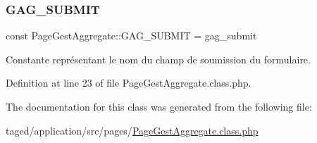 \subsubsection{\texorpdfstring{G\+A\+G\+\_\+\+S\+U\+B\+M\+IT}{GAG\_SUBMIT}}
{\footnotesize\ttfamily const Page\+Gest\+Aggregate\+::\+G\+A\+G\+\_\+\+S\+U\+B\+M\+IT = \textquotesingle{}gag\+\_\+submit\textquotesingle{}}

Constante représentant le nom du champ de soumission du formulaire. 

Definition at line 23 of file Page\+Gest\+Aggregate.\+class.\+php.



The documentation for this class was generated from the following file\+:\begin{DoxyCompactItemize}
\item 
taged/application/src/pages/\hyperlink{_page_gest_aggregate_8class_8php}{Page\+Gest\+Aggregate.\+class.\+php}\end{DoxyCompactItemize}
